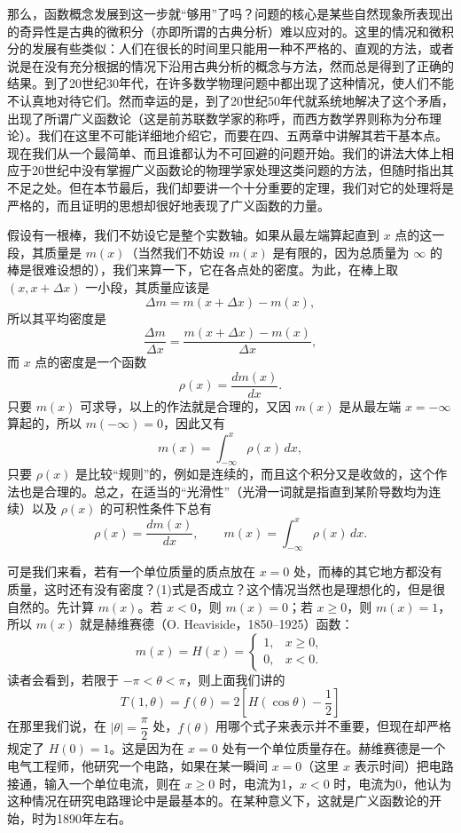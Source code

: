 那么，函数概念发展到这一步就“够用”了吗？问题的核心是某些自然现象所表现出的奇异性是古典的微积分（亦即所谓的古典分析）难以应对的。这里的情况和微积分的发展有些类似：人们在很长的时间里只能用一种不严格的、直观的方法，或者说是在没有充分根据的情况下沿用古典分析的概念与方法，然而总是得到了正确的结果。到了20世纪30年代，在许多数学物理问题中都出现了这种情况，使人们不能不认真地对待它们。然而幸运的是，到了20世纪50年代就系统地解决了这个矛盾，出现了所谓广义函数论（这是前苏联数学家的称呼，而西方数学界则称为分布理论）。我们在这里不可能详细地介绍它，而要在四、五两章中讲解其若干基本点。现在我们从一个最简单、而且谁都认为不可回避的问题开始。我们的讲法大体上相应于20世纪中没有掌握广义函数论的物理学家处理这类问题的方法，但随时指出其不足之处。但在本节最后，我们却要讲一个十分重要的定理，我们对它的处理将是严格的，而且证明的思想却很好地表现了广义函数的力量。

假设有一根棒，我们不妨设它是整个实数轴。如果从最左端算起直到 $x$ 点的这一段，其质量是 $m(x)$（当然我们不妨设 $m(x)$ 是有限的，因为总质量为 $\infty$ 的棒是很难设想的），我们来算一下，它在各点处的密度。为此，在棒上取 $(x,x+\Delta x)$ 一小段，其质量应该是
\[
\Delta m=m(x+\Delta x)-m(x),
\]
所以其平均密度是
\[
\frac{\Delta m}{\Delta x}=\frac{m(x+\Delta x)-m(x)}{\Delta x},
\]
而 $x$ 点的密度是一个函数
\[
\rho(x)=\frac{dm(x)}{dx}.
\]
只要 $m(x)$ 可求导，以上的作法就是合理的，又因 $m(x)$ 是从最左端 $x=-\infty$ 算起的，所以 $m(-\infty)=0$，因此又有
\[
m(x)=\int_{-\infty}^{x}\rho(x)\,dx,
\]
只要 $\rho(x)$ 是比较“规则”的，例如是连续的，而且这个积分又是收敛的，这个作法也是合理的。总之，在适当的“光滑性”（光滑一词就是指直到某阶导数均为连续）以及 $\rho(x)$ 的可积性条件下总有
\[
\rho(x)=\frac{dm(x)}{dx},
\qquad
m(x)=\int_{-\infty}^{x}\rho(x)\,dx. \tag{1}
\]

可是我们来看，若有一个单位质量的质点放在 $x=0$ 处，而棒的其它地方都没有质量，这时还有没有密度？(1)式是否成立？这个情况当然也是理想化的，但是很自然的。先计算 $m(x)$。若 $x<0$，则 $m(x)=0$；若 $x\ge0$，则 $m(x)=1$，所以 $m(x)$ 就是赫维赛德（O. Heaviside，1850--1925）函数：
\[
m(x)=H(x)=
\begin{cases}
1, & x\ge0,\\
0, & x<0.
\end{cases} \tag{2}
\]
读者会看到，若限于 $-\pi<\theta<\pi$，则上面我们讲的
\[
T(1,\theta)=f(\theta)=2\left[H(\cos\theta)-\frac12\right]
\]
在那里我们说，在 $|\theta|=\dfrac{\pi}{2}$ 处，$f(\theta)$ 用哪个式子来表示并不重要，但现在却严格规定了 $H(0)=1$。这是因为在 $x=0$ 处有一个单位质量存在。赫维赛德是一个电气工程师，他研究一个电路，如果在某一瞬间 $x=0$（这里 $x$ 表示时间）把电路接通，输入一个单位电流，则在 $x\ge0$ 时，电流为1，$x<0$ 时，电流为0，他认为这种情况在研究电路理论中是最基本的。在某种意义下，这就是广义函数论的开始，时为1890年左右。

